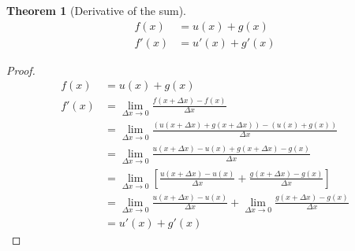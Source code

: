 \documentclass{article}
\newtheorem{theorem}{Theorem}[section]
\theoremstyle{definition}
\begin{document}
\begin{theorem}[Derivative of the sum]\label{theorems:calulus:derivatives:sum}
	\begin{align*}
	f(x) &= u(x)+g(x)\\
	f'(x) &= u'(x)+g'(x)
	\end{align*}
\end{theorem}
\begin{proof}
	\begin{align*}
	f(x) &= u(x)+g(x) \\
	f'(x) &= \lim_{\Delta x \to 0} {\frac {f(x+\Delta x) - f(x)} {\Delta x}} \\
	&= \lim_{\Delta x \to 0} {\frac {(u(x+\Delta x)+g(x + \Delta x)) - (u(x)+g(x))} {\Delta x}} \\
	&= \lim_{\Delta x \to 0} {\frac {u(x+\Delta x) - u(x) +g(x + \Delta x) - g(x)} {\Delta x}} \\
	&= \lim_{\Delta x \to 0} {\left[\frac {u(x+\Delta x) - u(x)} {\Delta x} + \frac {g(x + \Delta x) - g(x)} {\Delta x} \right]} \\
	&= \lim_{\Delta x \to 0} {\frac {u(x+\Delta x) - u(x)} {\Delta x}} + \lim_{\Delta x \to 0} {\frac {g(x + \Delta x) - g(x)} {\Delta x}} \\
	&= u'(x) + g'(x)
	\end{align*}
\end{proof}
\end{document}
